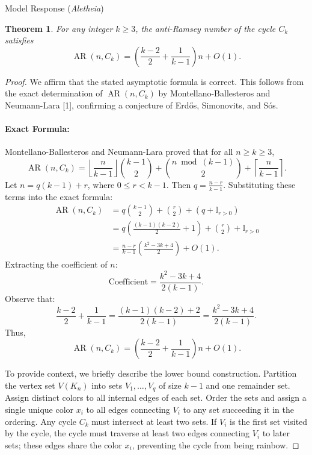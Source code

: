 \documentclass[11pt]{article}
\DeclareMathOperator{\AR}{AR}
\newtheorem{theorem}{Theorem}
\begin{document}
\begin{solution}{Model Response (\emph{Aletheia})}
    \begin{theorem}
For any integer $k \ge 3$, the anti-Ramsey number of the cycle $C_k$ satisfies
\[ \AR(n, C_k) = \left(\frac{k-2}{2} + \frac{1}{k-1}\right)n + O(1). \]
\end{theorem}

\begin{proof}
We affirm that the stated asymptotic formula is correct. This follows from the exact determination of $\AR(n, C_k)$ by Montellano-Ballesteros and Neumann-Lara [1], confirming a conjecture of Erdős, Simonovits, and Sós.

\paragraph{Exact Formula:}
Montellano-Ballesteros and Neumann-Lara proved that for all $n \ge k \ge 3$,
\[ \AR(n, C_k) = \left\lfloor \frac{n}{k-1} \right\rfloor \binom{k-1}{2} + \binom{n \bmod (k-1)}{2} + \left\lceil \frac{n}{k-1} \right\rceil. \]
Let $n = q(k-1) + r$, where $0 \le r < k-1$. Then $q = \frac{n-r}{k-1}$.
Substituting these terms into the exact formula:
\begin{align*}
\AR(n, C_k) &= q \binom{k-1}{2} + \binom{r}{2} + \left(q + \mathbb{I}_{r>0}\right) \\
&= q \left( \frac{(k-1)(k-2)}{2} + 1 \right) + \binom{r}{2} + \mathbb{I}_{r>0} \\
&= \frac{n-r}{k-1} \left( \frac{k^2 - 3k + 4}{2} \right) + O(1).
\end{align*}
Extracting the coefficient of $n$:
\[ \text{Coefficient} = \frac{k^2 - 3k + 4}{2(k-1)}. \]
Observe that:
\[ \frac{k-2}{2} + \frac{1}{k-1} = \frac{(k-1)(k-2) + 2}{2(k-1)} = \frac{k^2 - 3k + 4}{2(k-1)}. \]
Thus,
\[ \AR(n, C_k) = \left( \frac{k-2}{2} + \frac{1}{k-1} \right)n + O(1). \]



To provide context, we briefly describe the lower bound construction. Partition the vertex set $V(K_n)$ into sets $V_1, \dots, V_q$ of size $k-1$ and one remainder set. Assign distinct colors to all internal edges of each set. Order the sets and assign a single unique color $x_i$ to all edges connecting $V_i$ to any set succeeding it in the ordering. Any cycle $C_k$ must intersect at least two sets. If $V_i$ is the first set visited by the cycle, the cycle must traverse at least two edges connecting $V_i$ to later sets; these edges share the color $x_i$, preventing the cycle from being rainbow.
\end{proof}



\end{solution}
\end{document}
